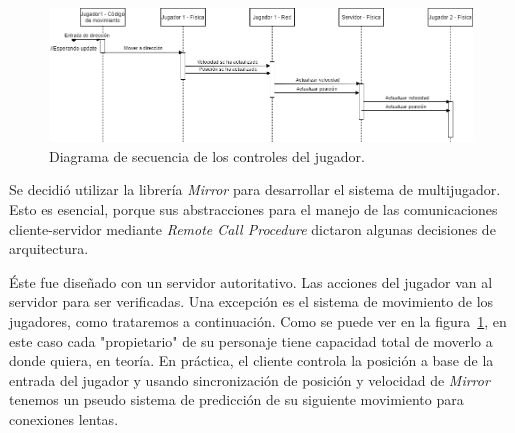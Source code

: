 \begin{figure}[H]
    \centering
    \includegraphics[width=1\linewidth]{images/diagrama_secuencia_movimientos.png}
    \caption{Diagrama de secuencia de los controles del jugador.}
    \label{fig:diagrama_sec_movimiento}
\end{figure}

Se decidió utilizar la librería \textit{Mirror} para desarrollar el sistema de multijugador. Esto es esencial, porque sus abstracciones para el manejo de las comunicaciones cliente-servidor mediante \textit{Remote Call Procedure} dictaron algunas decisiones de arquitectura.

Éste fue diseñado con un servidor autoritativo. Las acciones del jugador van al servidor para ser verificadas. Una excepción es el sistema de movimiento de los jugadores, como trataremos a continuación. Como se puede ver en la figura~\ref{fig:diagrama_sec_movimiento}, en este caso cada "propietario" de su personaje tiene capacidad total de moverlo a donde quiera, en teoría. En práctica, el cliente controla la posición a base de la entrada del jugador y usando sincronización de posición y velocidad de \textit{Mirror} tenemos un pseudo sistema de predicción de su siguiente movimiento para conexiones lentas. 

